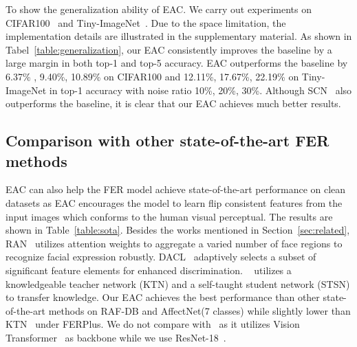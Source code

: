 \documentclass[runningheads]{llncs}
\begin{document}
To show the generalization ability of EAC. We carry out experiments on CIFAR100~\cite{krizhevsky2009learning} and Tiny-ImageNet~\cite{russakovsky2015imagenet}. Due to the space limitation, the implementation details are illustrated in the supplementary material. As shown in Tabel~\ref{table:generalization}, our EAC consistently improves the baseline by a large margin in both top-1 and top-5 accuracy. EAC outperforms the baseline by 6.37\% , 9.40\%, 10.89\% on CIFAR100 and 12.11\%, 17.67\%, 22.19\% on Tiny-ImageNet in top-1 accuracy with noise ratio 10\%, 20\%, 30\%. Although SCN~\cite{wang2020suppressing} also outperforms the baseline, it is clear that our EAC achieves much better results.




\subsection{Comparison with other state-of-the-art FER methods}
EAC can also help the FER model achieve state-of-the-art performance on clean datasets as EAC encourages the model to learn flip consistent features from the input images which conforms to the human visual perceptual. The results are shown in Table~\ref{table:sota}. Besides the works mentioned in Section~\ref{sec:related}, RAN~\cite{wang2020region} utilizes attention weights to aggregate a varied number of face regions to recognize facial expression robustly. DACL~\cite{farzaneh2021facial} adaptively selects a subset of signiﬁcant feature elements for enhanced discrimination. ~\cite{li2021adaptively} utilizes a knowledgeable teacher network (KTN) and a self-taught student network (STSN) to transfer knowledge. Our EAC achieves the best performance than other state-of-the-art methods on RAF-DB and AffectNet(7 classes) while slightly lower than KTN~\cite{li2021adaptively} under FERPlus. We do not compare with~\cite{xue2021transfer} as it utilizes Vision Transformer~\cite{dosovitskiy2020image} as backbone while we use ResNet-18~\cite{he2016deep}.
\end{document}
